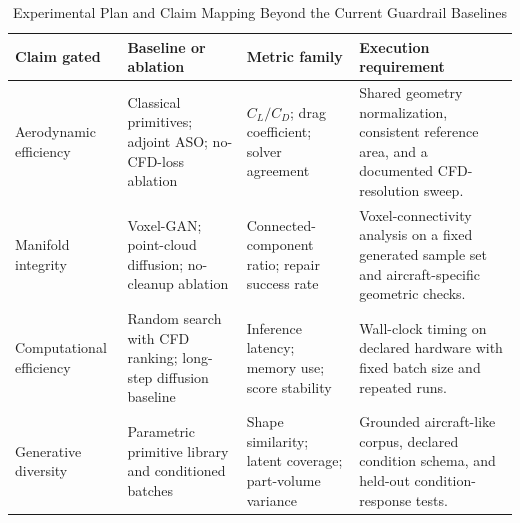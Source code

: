\begin{table}[t]
\centering
\caption{Experimental Plan and Claim Mapping Beyond the Current Guardrail Baselines}
\label{tab:experimental_plan}
\footnotesize
\renewcommand{\arraystretch}{1.18}
\begin{tabular}{|p{}|p{}|p{}|p{}|}
\hline
\textbf{Claim gated} & \textbf{Baseline or ablation} & \textbf{Metric family} & \textbf{Execution requirement} \\ \hline
Aerodynamic efficiency & Classical primitives; adjoint ASO; no-CFD-loss ablation & $C_L/C_D$; drag coefficient; solver agreement & Shared geometry normalization, consistent reference area, and a documented CFD-resolution sweep. \\ \hline
Manifold integrity & Voxel-GAN; point-cloud diffusion; no-cleanup ablation & Connected-component ratio; repair success rate & Voxel-connectivity analysis on a fixed generated sample set and aircraft-specific geometric checks. \\ \hline
Computational efficiency & Random search with CFD ranking; long-step diffusion baseline & Inference latency; memory use; score stability & Wall-clock timing on declared hardware with fixed batch size and repeated runs. \\ \hline
Generative diversity & Parametric primitive library and conditioned batches & Shape similarity; latent coverage; part-volume variance & Grounded aircraft-like corpus, declared condition schema, and held-out condition-response tests. \\ \hline
\end{tabular}
\end{table}
